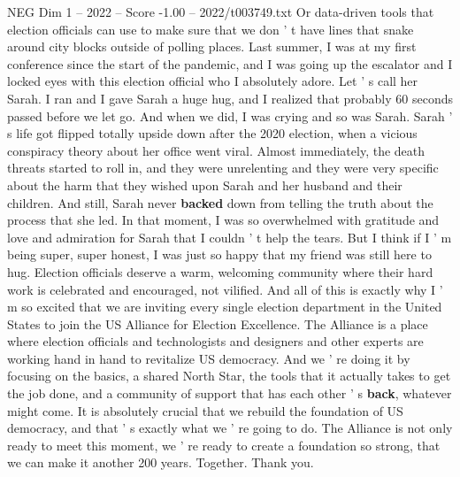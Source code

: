 \begin{textsample}{NEG Dim 1 – 2022 – Score -1.00 – 2022/t003749.txt}
Or data-driven tools that election officials can use to make sure that we don ' t have lines that snake around city blocks outside of polling places.
Last summer, I was at my first conference since the start of the pandemic, and I was going up the escalator and I locked eyes with this election official who I absolutely adore.
Let ' s call her Sarah.
I ran and I gave Sarah a huge hug, and I realized that probably 60 seconds passed before we let go.
And when we did, I was crying and so was Sarah.
Sarah ' s life got flipped totally upside down after the 2020 election, when a vicious conspiracy theory about her office went viral.
Almost immediately, the death threats started to roll in, and they were unrelenting and they were very specific about the harm that they wished upon Sarah and her husband and their children.
And still, Sarah never \textbf{backed} down from telling the truth about the process that she led.
In that moment, I was so overwhelmed with gratitude and love and admiration for Sarah that I couldn ' t help the tears.
But I think if I ' m being super, super honest, I was just so happy that my friend was still here to hug.
Election officials deserve a warm, welcoming community where their hard work is celebrated and encouraged, not vilified.
And all of this is exactly why I ' m so excited that we are inviting every single election department in the United States to join the US Alliance for Election Excellence.
The Alliance is a place where election officials and technologists and designers and other experts are working hand in hand to revitalize US democracy.
And we ' re doing it by focusing on the basics, a shared North Star, the tools that it actually takes to get the job done, and a community of support that has each other ' s \textbf{back}, whatever might come.
It is absolutely crucial that we rebuild the foundation of US democracy, and that ' s exactly what we ' re going to do.
The Alliance is not only ready to meet this moment, we ' re ready to create a foundation so strong, that we can make it another 200 years.
Together.
Thank you.

\end{textsample}
